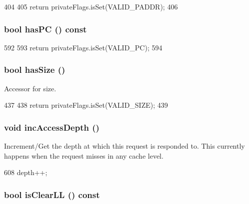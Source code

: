 \begin{DoxyCode}
404     {
405         return privateFlags.isSet(VALID_PADDR);
406     }
\end{DoxyCode}
\hypertarget{classRequest_a0ae031e5463fc62226d112dfbad6c08c}{
\subsubsection[{hasPC}]{\setlength{\rightskip}{0pt plus 5cm}bool hasPC () const}}
\label{classRequest_a0ae031e5463fc62226d112dfbad6c08c}



\begin{DoxyCode}
592     {
593         return privateFlags.isSet(VALID_PC);
594     }
\end{DoxyCode}
\hypertarget{classRequest_aa0a08d6a3e0e8ca6801d0b8668b2800a}{
\subsubsection[{hasSize}]{\setlength{\rightskip}{0pt plus 5cm}bool hasSize ()}}
\label{classRequest_aa0a08d6a3e0e8ca6801d0b8668b2800a}
Accessor for size. 


\begin{DoxyCode}
437     {
438         return privateFlags.isSet(VALID_SIZE);
439     }
\end{DoxyCode}
\hypertarget{classRequest_ad0fbbce566d827662e10f495bae4d421}{
\subsubsection[{incAccessDepth}]{\setlength{\rightskip}{0pt plus 5cm}void incAccessDepth ()}}
\label{classRequest_ad0fbbce566d827662e10f495bae4d421}
Increment/Get the depth at which this request is responded to. This currently happens when the request misses in any cache level. 


\begin{DoxyCode}
608 { depth++; }
\end{DoxyCode}
\hypertarget{classRequest_ab212f26b531d63897c5458251027c37e}{
\subsubsection[{isClearLL}]{\setlength{\rightskip}{0pt plus 5cm}bool isClearLL () const}}
\label{classRequest_ab212f26b531d63897c5458251027c37e}




